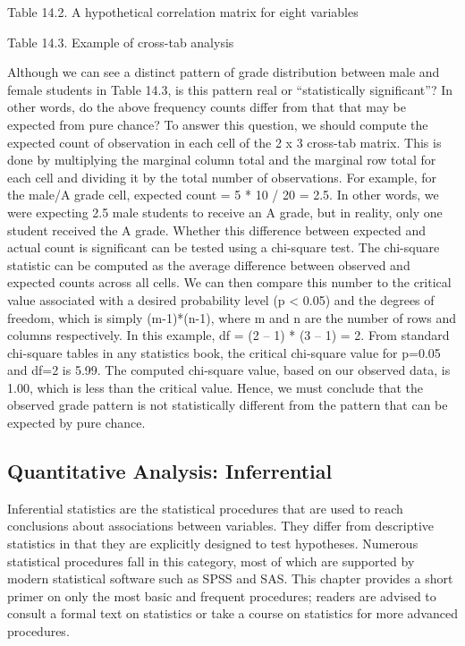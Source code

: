 Table 14.2. A hypothetical correlation matrix for eight variables

Table 14.3. Example of cross-tab analysis

Although we can see a distinct pattern of grade distribution between male and female students in Table 14.3, is this pattern real or “statistically significant”? In other words, do the above frequency counts differ from that that may be expected from pure chance? To answer this question, we should compute the expected count of observation in each cell of the 2 x 3 cross-tab matrix. This is done by multiplying the marginal column total and the marginal row total for each cell and dividing it by the total number of observations. For example, for the male/A grade cell, expected count = 5 * 10 / 20 = 2.5. In other words, we were expecting 2.5 male students to receive an A grade, but in reality, only one student received the A grade. Whether this difference between expected and actual count is significant can be tested using a chi-square test. The chi-square statistic can be computed as the average difference between observed and expected counts across all cells. We can then compare this number to the critical value associated with a desired probability level (p < 0.05) and the degrees of freedom, which is simply (m-1)*(n-1), where m and n are the number of rows and columns respectively. In this example, df = (2 – 1) * (3 – 1) = 2. From standard chi-square tables in any statistics book, the critical chi-square value for p=0.05 and df=2 is 5.99. The computed chi-square value, based on our observed data, is 1.00, which is less than the critical value. Hence, we must conclude that the observed grade pattern is not statistically different from the pattern that can be expected by pure chance.

\subsection{Quantitative Analysis: Inferrential}

Inferential statistics are the statistical procedures that are used to reach conclusions about associations between variables. They differ from descriptive statistics in that they are explicitly designed to test hypotheses. Numerous statistical procedures fall in this category, most of which are supported by modern statistical software such as SPSS and SAS. This chapter provides a short primer on only the most basic and frequent procedures; readers are advised to consult a formal text on statistics or take a course on statistics for more advanced procedures.

